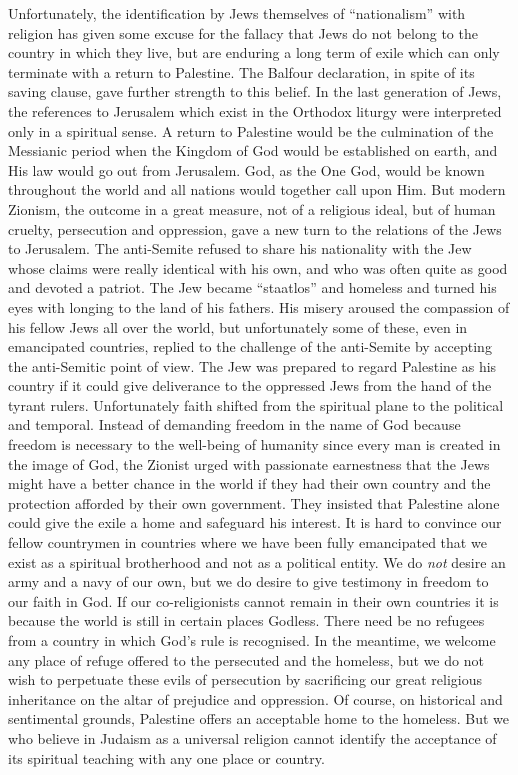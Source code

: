 Unfortunately, the identification by Jews themselves
of “nationalism” with religion has given some
excuse for the fallacy that Jews do not belong to the
country in which they live, but are enduring a long term
of exile which can only terminate with a return to
Palestine. The Balfour declaration, in spite of its saving
clause, gave further strength to this belief. In the last
generation of Jews, the references to Jerusalem which
exist in the Orthodox liturgy were interpreted only in a
spiritual sense. A return to Palestine would be the
culmination of the Messianic period when the Kingdom
of God would be established on earth, and His law would
go out from Jerusalem. God, as the One God, would be
known throughout the world and all nations would
together call upon Him. But modern Zionism, the
outcome in a great measure, not of a religious ideal, but
of human cruelty, persecution and oppression, gave a
new turn to the relations of the Jews to Jerusalem. The
anti-Semite refused to share his nationality with the
Jew whose claims were really identical with his own, and
who was often quite as good and devoted a patriot. The
Jew became “staatlos” and homeless and turned his
eyes with longing to the land of his fathers. His misery
aroused the compassion of his fellow Jews all over the
world, but unfortunately some of these, even in emancipated
countries, replied to the challenge of the anti-Semite
by accepting the anti-Semitic point of view. The Jew was
prepared to regard Palestine as his country if it could
give deliverance to the oppressed Jews from the hand of
the tyrant rulers. Unfortunately faith shifted from
the spiritual plane to the political and temporal. Instead
of demanding freedom in the name of God because
freedom is necessary to the well-being of humanity
since every man is created in the image of God, the
Zionist urged with passionate earnestness that the Jews
might have a better chance in the world if they had their
own country and the protection afforded by their own
government. They insisted that Palestine alone could
give the exile a home and safeguard his interest. It is
hard to convince our fellow countrymen in countries
where we have been fully emancipated that we exist as a
spiritual brotherhood and not as a political entity. We
do \textsl{not} desire an army and a navy of our own, but we do
desire to give testimony in freedom to our faith in God.
If our co-religionists cannot remain in their own countries
it is because the world is still in certain places Godless.
There need be no refugees from a country in which God’s
rule is recognised. In the meantime, we welcome any
place of refuge offered to the persecuted and the homeless,
but we do not wish to perpetuate these evils of persecution
by sacrificing our great religious inheritance on the altar
of prejudice and oppression. Of course, on historical and
sentimental grounds, Palestine offers an acceptable
home to the homeless. But we who believe in Judaism
as a universal religion cannot identify the acceptance of
its spiritual teaching with any one place or country.

